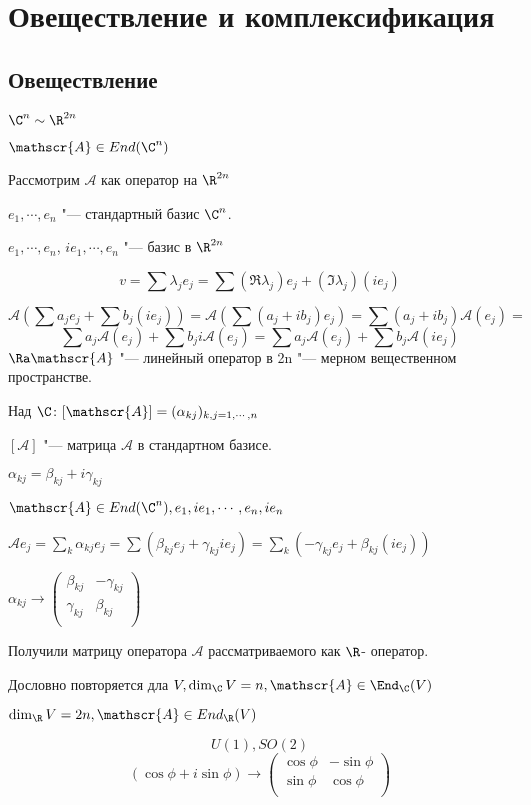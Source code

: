 ﻿\section{Овеществление и комплексификация}
\subsection{Овеществление}
$\C^n \sim \R^{2n}$

$\mathscr{A} \in End(\C^n)$

Рассмотрим $\mathscr{A}$ как оператор на $\R^{2n}$

$e_1, \cdots, e_n$ "--- стандартный базис $\C^n$.

$e_1, \cdots, e_n$, $ie_1, \cdots, e_n$ "--- базис в $\R^{2n}$

$$v = \sum \lambda_j e_j = \sum (\Re \lambda_j)e_j + (\Im \lambda_j)(i e_j)$$

$$\mathscr{A}(\sum a_j e_j + \sum b_j(i e_j)) = \mathscr{A}(\sum(a_j + i b_j)e_j) = \sum(a_j + ib_j)\mathscr{A}(e_j) =$$
$$\sum a_j \mathscr{A}(e_j) + \sum b_j i \mathscr{A}(e_j) = \sum a_j \mathscr{A}(e_j) + \sum b_j \mathscr{A}(ie_j)$$
$\Ra \mathscr{A}$ "--- линейный оператор в 2n "--- мерном вещественном пространстве.

Над $\C\colon [\mathscr{A}] = (\alpha_{kj})_{k, j = 1, \cdots, n}$ 

$[\mathscr{A}]$ "--- матрица $\mathscr{A}$ в стандартном базисе. 

$\alpha_{kj} = \beta_{kj} + i \gamma_{kj}$

$\mathscr{A} \in End(\C^n), e_1, ie_1, \cdots, e_n, ie_n$

$\mathscr{A}e_j = \sum_k \alpha_{kj}e_j = \sum (\beta_{kj}e_j + \gamma_{kj}ie_j) = 
\sum_k(-\gamma_{kj}e_j + \beta_{kj}(ie_j))$ 

$\alpha_{kj} \to \begin{pmatrix}
\beta_{kj} & -\gamma_{kj} \\
\gamma_{kj} & \beta_{kj}\\
\end{pmatrix}$

Получили матрицу оператора $\mathscr{A}$  рассматриваемого как $\R$- оператор. 

Дословно повторяется дла $V, \dim_{\C}V = n, \mathscr{A} \in \End_{\C}(V)$

$\dim_{\R}V = 2n, \mathscr{A} \in End_{\R}(V)$

$$U(1), SO(2)$$
$$(\cos\phi + i \sin \phi) \to 
\begin{pmatrix}
\cos \phi & -\sin \phi\\
\sin \phi & \cos \phi\\
\end{pmatrix}$$

